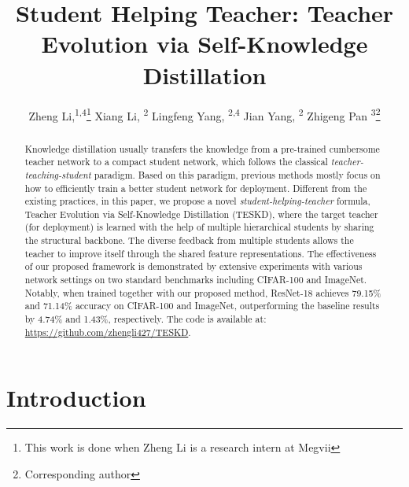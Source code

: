\documentclass[letterpaper]{article} %
\title{Student Helping Teacher: Teacher Evolution via Self-Knowledge Distillation}
\author {
	Zheng Li,\textsuperscript{\rm 1,4}\thanks{This work is done when Zheng Li is a research intern at Megvii}
	Xiang Li, \textsuperscript{\rm 2}
	Lingfeng Yang, \textsuperscript{\rm 2,4}
	Jian Yang, \textsuperscript{\rm 2} 
	Zhigeng Pan \textsuperscript{\rm 3}\thanks{Corresponding author}
	\\
}
\newcommand{\lz}[1]{\textcolor{red}{#1}}
\newcommand{\rewrite}[1]{{\textcolor{red}{#1}}}
\begin{document}
\maketitle

\begin{abstract}
	
Knowledge distillation usually transfers the knowledge from a pre-trained cumbersome teacher network to a compact student network, which follows the classical \textit{teacher-teaching-student} paradigm. Based on this paradigm, previous methods mostly focus on how to efficiently train a better student network for deployment. Different from the existing practices, in this paper, we propose a novel \textit{student-helping-teacher} formula, Teacher Evolution via Self-Knowledge Distillation (TESKD), where the target teacher (for deployment) is learned with the help of multiple hierarchical students by sharing the structural backbone. The diverse feedback from multiple students allows the teacher to improve itself through the shared feature representations.
The effectiveness of our proposed framework is demonstrated by extensive experiments with various network settings on two standard benchmarks including CIFAR-100 and ImageNet. Notably, when trained together with our proposed method, ResNet-18 achieves 79.15\% and 71.14\% accuracy on CIFAR-100 and ImageNet, outperforming the baseline results by 4.74\% and 1.43\%, respectively. The code is available at: \url{https://github.com/zhengli427/TESKD}.
	
	
	
\end{abstract}


\section{Introduction}
\end{document}
